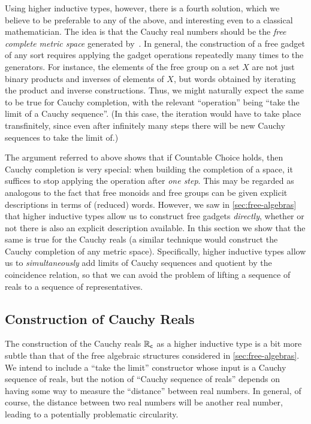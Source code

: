 Using higher inductive types, however, there is a fourth solution, which we believe to be preferable to any of the above, and interesting even to a classical mathematician.
The idea is that the Cauchy real numbers should be the \emph{free complete metric space} generated by~\Q.
In general, the construction of a free gadget of any sort requires applying the gadget operations repeatedly many times to the generators.
For instance, the elements of the free group on a set $X$ are not just binary products and inverses of elements of $X$, but words obtained by iterating the product and inverse constructions.
Thus, we might naturally expect the same to be true for Cauchy completion, with the relevant ``operation'' being ``take the limit of a Cauchy sequence''.
(In this case, the iteration would have to take place transfinitely, since even after infinitely many steps there will be new Cauchy sequences to take the limit of.)

The argument referred to above shows that if Countable Choice holds, then Cauchy completion is very special: when building the completion of a space, it suffices to stop applying the operation after \emph{one step}.
This may be regarded as analogous to the fact that free monoids and free groups can be given explicit descriptions in terms of (reduced) words.
However, we saw in \autoref{sec:free-algebras} that higher inductive types allow us to construct free gadgets \emph{directly}, whether or not there is also an explicit description available.
In this section we show that the same is true for the Cauchy reals (a similar technique would construct the Cauchy completion of any metric space).
Specifically, higher inductive types allow us to \emph{simultaneously} add limits of Cauchy sequences and quotient by the coincidence relation, so that we can avoid the problem of lifting a sequence of reals to a sequence of representatives.


\subsection{Construction of Cauchy Reals}
\label{sec:constr-cauchy-reals}

The construction of the Cauchy reals $\mathbb{R}_\mathsf{c}$ as a higher inductive type is a bit more subtle than that of the free algebraic structures considered in \autoref{sec:free-algebras}.
We intend to include a ``take the limit'' constructor whose input is a Cauchy sequence of reals, but the notion of ``Cauchy sequence of reals'' depends on having some way to measure the ``distance'' between real numbers.
In general, of course, the distance between two real numbers will be another real number, leading to a potentially problematic circularity.

